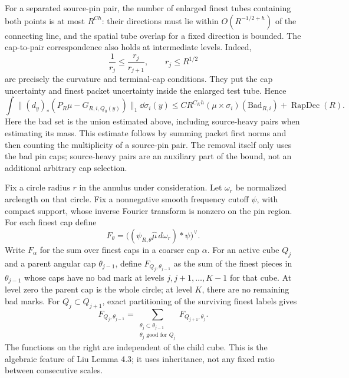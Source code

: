For a separated source-pin pair, the number of enlarged finest tubes containing both points is at most \(R^{C h}\): their directions must lie within \(O(R^{-1/2+h})\) of the connecting line, and the spatial tube overlap for a fixed direction is bounded. The cap-to-pair correspondence also holds at intermediate levels. Indeed,
$$
 \frac1{r_j}\leq\frac{r_j}{r_{j+1}},\qquad r_j\leq R^{1/2}
$$
are precisely the curvature and terminal-cap conditions. They put the cap uncertainty and finest packet uncertainty inside the enlarged test tube. Hence
\begin{equation}\label{fprof:badL1}
 \int\|(d_y)_*(P_R\mu-G_{R,i,Q_0(y)})\|_1\dd\sigma_i(y)
 \leq C R^{C_Kh} (\mu\times\sigma_i)(\mathrm{Bad}_{R,i})
       +\operatorname{RapDec}(R).
\end{equation}
Here the bad set is the union estimated above, including source-heavy pairs when estimating its mass. This estimate follows by summing packet first norms and then counting the multiplicity of a source-pin pair. The removal itself only uses the bad pin caps; source-heavy pairs are an auxiliary part of the bound, not an additional arbitrary cap selection.

Fix a circle radius \(r\) in the annulus under consideration. Let \(\omega_r\) be normalized arclength on that circle. Fix a nonnegative smooth frequency cutoff \(\psi\), with compact support, whose inverse Fourier transform is nonzero on the pin region. For each finest cap define
$$
 F_\theta=\big((\psi_{R,\theta}\widehat\mu\,d\omega_r)*\psi\big)^\vee.
$$
Write \(F_\alpha\) for the sum over finest caps in a coarser cap \(\alpha\). For an active cube \(Q_j\) and a parent angular cap \(\theta_{j-1}\), define \(F_{Q_j,\theta_{j-1}}\) as the sum of the finest pieces in \(\theta_{j-1}\) whose caps have no bad mark at levels \(j,j+1,\ldots,K-1\) for that cube. At level zero the parent cap is the whole circle; at level \(K\), there are no remaining bad marks. For \(Q_j\subset Q_{j+1}\), exact partitioning of the surviving finest labels gives
\begin{equation}\label{fprof:identity}
 F_{Q_j,\theta_{j-1}}
 =\sum_{\substack{\theta_j\subset\theta_{j-1}\\
                   \theta_j\text{ good for }Q_j}}
       F_{Q_{j+1},\theta_j}.
\end{equation}
The functions on the right are independent of the child cube. This is the algebraic feature of Liu Lemma 4.3; it uses inheritance, not any fixed ratio between consecutive scales.

